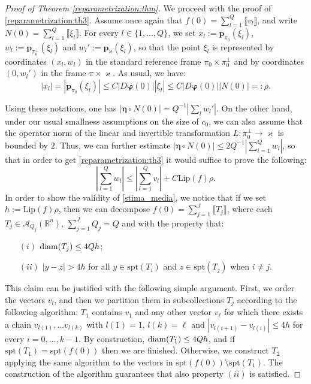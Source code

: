 \documentclass[a4paper,11pt,reqno]{amsart}
\theoremstyle{definition}
\numberwithin{equation}{section}
\numberwithin{subsection}{section}
\newcommand{\R}{\mathbb{R}}
\newcommand{\A}{\mathcal{A}}
\newcommand{\Lip}{\mathrm{Lip}}
\newcommand{\spt}{\mathrm{spt}}
\newcommand{\bphi}{\boldsymbol{\varphi}}
\newcommand{\bfeta}{\boldsymbol{\eta}}
\newcommand{\p}{\mathbf{p}}
\begin{document}
\begin{proof}[Proof of Theorem \ref{reparametrization:thm}]
We proceed with the proof of \eqref{reparametrization:th3}. Assume once again that $f(0) = \sum_{l=1}^{Q} \llbracket v_{l} \rrbracket$, and write $N(0) = \sum_{l=1}^{Q} \llbracket \xi_{l} \rrbracket$. For every $l \in \{1, \dots, Q\}$, we set $x_{l} := \p_{\pi_0}(\xi_l)$, $w_{l} := \p_{\pi_{0}^{\perp}}(\xi_l)$ and $w_{l}' := \p_{\varkappa}(\xi_{l})$, so that the point $\xi_{l}$ is represented by coordinates $\left( x_{l}, w_{l} \right)$ in the standard reference frame $\pi_{0} \times \pi_{0}^{\perp}$ and by coordinates $\left( 0, w_{l}' \right)$ in the frame $\pi \times \varkappa$. As usual, we have:
\begin{equation} \label{lungh_orizz} 
|x_{l}| = |\p_{\pi_0}(\xi_l)| \leq C |D \bphi(0)| |\xi_{l}| \leq C |D \bphi(0)| |N(0)| =: \rho.
\end{equation}

Using these notations, one has $|\bfeta \circ N(0)| = Q^{-1} \left| \sum_{l} w_{l}' \right|$. On the other hand, under our usual smallness assumptions on the size of $c_{0}$, we can also assume that the operator norm of the linear and invertible transformation $L \colon \pi_{0}^{\perp} \to \varkappa$ is bounded by $2$. Thus, we can further estimate $|\bfeta \circ N(0)| \leq 2 Q^{-1} \left| \sum_{l=1}^{Q} w_{l} \right|$, so that in order to get \eqref{reparametrization:th3} it would suffice to prove the following:
\begin{equation} \label{stima_media}
\left| \sum_{l=1}^{Q} w_{l} \right| \leq \left| \sum_{l=1}^{Q} v_{l} \right| + C \Lip(f) \rho.
\end{equation}
In order to show the validity of \eqref{stima_media}, we notice that if we set $h := \Lip(f) \rho$, then we can decompose $f(0) = \sum_{j=1}^{J} \llbracket T_{j} \rrbracket$, where each $T_{j} \in \A_{Q_{j}}(\R^{n})$, $\sum_{j=1}^{J} Q_{j} = Q$ and with the property that:
\begin{itemize}
\item[$(i)$] ${\rm diam}(T_{j}) \leq 4Qh$;

\item[$(ii)$] $|y - z| > 4h$ for all $y \in \spt(T_{i})$ and $z \in \spt(T_{j})$ when $i \neq j$.
\end{itemize}

This claim can be justified with the following simple argument. First, we order the vectors $v_{l}$, and then we partition them in subcollections $T_{j}$ according to the following algorithm: $T_{1}$ contains $v_{1}$ and any other vector $v_{\ell}$ for which there exists a chain $v_{l(1)}, \dots v_{l(k)}$ with $l(1) = 1$, $l(k) = \ell$ and $|v_{l(i+1)} - v_{l(i)}| \leq 4h$ for every $i = 0, \dots, k-1$. By construction, ${\rm diam}(T_{1}) \leq 4Qh$, and if $\spt(T_{1}) = \spt(f(0))$ then we are finished. Otherwise, we construct $T_{2}$ applying the same algorithm to the vectors in $\spt(f(0)) \setminus \spt(T_{1})$. The construction of the algorithm guarantees that also property $(ii)$ is satisfied.


\end{proof}
\end{document}

